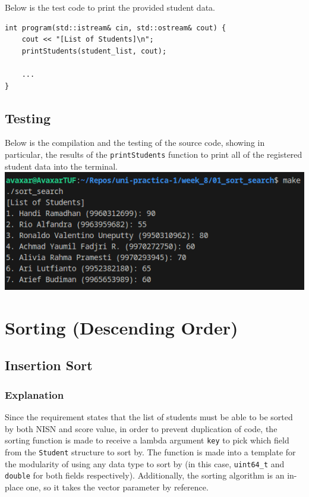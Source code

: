 \documentclass[12pt]{article}
\begin{document}
Below is the test code to print the provided student data.

\begin{verbatim}
int program(std::istream& cin, std::ostream& cout) {
    cout << "[List of Students]\n";
    printStudents(student_list, cout);

    ...
}
\end{verbatim}

\subsection{Testing}
Below is the compilation and the testing of the source code, showing in particular, the results of the \texttt{printStudents} function to print all of the registered student data into the terminal.
\newline\includegraphics[width=\textwidth]{01_sort_search_printing}

\section{Sorting (Descending Order)}

\subsection {Insertion Sort}

\subsubsection{Explanation}

Since the requirement states that the list of students must be able to be sorted by both NISN and score value, in order to prevent duplication of code, the sorting function is made to receive a lambda argument \texttt{key} to pick which field from the \texttt{Student} structure to sort by. The function is made into a template for the modularity of using any data type to sort by (in this case, \texttt{uint64\_t} and \texttt{double} for both fields respectively). Additionally, the sorting algorithm is an in-place one, so it takes the vector parameter by reference.
\end{document}
